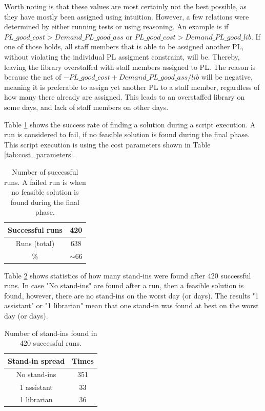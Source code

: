 Worth noting is that these values are most certainly not the best possible, as they have mostly been assigned using intuition. However, a few relations were determined by either running tests or using reasoning. An example is if $PL\_good\_cost > Demand\_PL\_good\_ass$ or $PL\_good\_cost > Demand\_PL\_good\_lib$. If one of those holds, all staff members that is able to be assigned another PL, without violating the individual PL assigment constraint, will be. Thereby, leaving the library overstaffed with staff members assigned to PL. The reason is because the net of $-PL\_good\_cost + Demand\_PL\_good\_ass/lib$ will be negative, meaning it is preferable to assign yet another PL to a staff member, regardless of how many there already are assigned. This leads to an overstaffed library on some days, and lack of staff members on other days.

Table \ref{successful_iter} shows the success rate of finding a solution during a script execution. A run is considered to fail, if no feasible solution is found during the final phase. This script execution is using the cost parameters shown in Table \ref{tab:cost_parameters}. 
\begin{table}[!h]
\centering
\caption{Number of successful runs. A failed run is when no feasible solution is found during the final phase.}
\label{successful_iter}
\begin{tabular}{|c|c|}
\hline
Successful runs         & 420      \\ \hline
Runs (total) & 638      \\ \hline
\%                 & $\sim$66 \\ \hline
\end{tabular}
\end{table}

Table \ref{tab:stand_in_spread} shows statistics of how many stand-ins were found after 420 successful runs. In case "No stand-ins" are found after a run, then a feasible solution is found, however, there are no stand-ins on the worst day (or days). The results "1 assistant" or "1 librarian" mean that one stand-in was found at best on the worst day (or days).
\begin{table}[!h]
\centering
\caption{Number of stand-ins found in 420 successful runs.}
\label{tab:stand_in_spread}
\begin{tabular}{|c|c|}
\hline
\rowcolor[HTML]{D2D2D2} 
Stand-in spread & Times \\ \hline
No stand-ins    & 351                      \\ \hline
1 assistant     & 33                      \\ \hline
1 librarian 	& 36 \\ \hline
\end{tabular}
\end{table}

